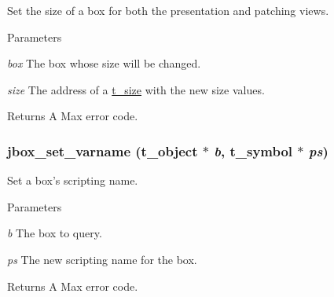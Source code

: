 Set the size of a box for both the presentation and patching views. 
\begin{DoxyParams}{Parameters}
\item[{\em box}]The box whose size will be changed. \item[{\em size}]The address of a \hyperlink{structt__size}{t\_\-size} with the new size values. \end{DoxyParams}
\begin{DoxyReturn}{Returns}
A Max error code. 
\end{DoxyReturn}
\hypertarget{group__jbox_gac4f46f657ca5087727fff6999c517d6c}{
\subsubsection[{jbox\_\-set\_\-varname}]{ jbox\_\-set\_\-varname ({\bf t\_\-object} $\ast$ {\em b}, \/  {\bf t\_\-symbol} $\ast$ {\em ps})}}
\label{group__jbox_gac4f46f657ca5087727fff6999c517d6c}


Set a box's scripting name. 
\begin{DoxyParams}{Parameters}
\item[{\em b}]The box to query. \item[{\em ps}]The new scripting name for the box. \end{DoxyParams}
\begin{DoxyReturn}{Returns}
A Max error code. 
\end{DoxyReturn}
